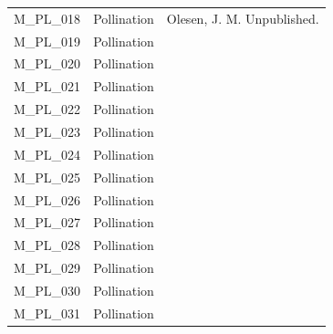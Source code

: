 \documentclass[12pt]{article}
\begin{document}
\begin{spacing}{1.5}
\begin{table}[!h]
\begin{center}
\begin{tabular}{|l l m{10cm} |}
    M\_PL\_018  & Pollination & Olesen, J. M. Unpublished.  \\
    M\_PL\_019  & Pollination & \citep{Inouye1988}  \\
    M\_PL\_020  & Pollination & \citep{Kevan1970} \\
    M\_PL\_021  & Pollination & \citep{Kato1990}  \\
    M\_PL\_022  & Pollination & \citep{Medan2002} \\
    M\_PL\_023  & Pollination & \citep{Medan2002} \\
    M\_PL\_024  & Pollination & \citep{Mosquin1967} \\
    M\_PL\_025  & Pollination & \citep{Motten1982}  \\
    M\_PL\_026  & Pollination & \citep{McMullen1993}  \\
    M\_PL\_027  & Pollination & \citep{Primack1983} \\
    M\_PL\_028  & Pollination & \citep{Primack1983} \\
    M\_PL\_029  & Pollination & \citep{Primack1983} \\
    M\_PL\_030  & Pollination & \citep{Ramirez1992} \\
    M\_PL\_031  & Pollination & \citep{Ramirez1989} \\
    \hline
    \end{tabular}
    \end{center}
    \end{table}

    \clearpage
    \newpage


\end{spacing}
\end{document}
